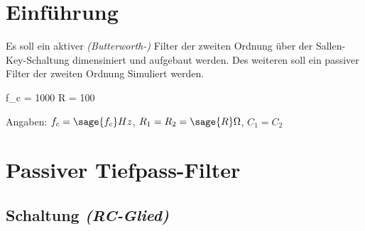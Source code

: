 \documentclass[a4paper]{hitec}
\author{Rene Hampölz, Gruppe 6}
\date{19. September 2022}
\begin{document}


\maketitletoc
\clearpage

\section{Einführung}

Es soll ein aktiver \textit{(Butterworth-)} Filter der zweiten Ordnung über der Sallen-Key-Schaltung dimensiniert und aufgebaut werden. Des weiteren soll ein passiver Filter der zweiten Ordnung Simuliert werden.

\begin{sagesilent}
    f_c = 1000
    R = 100
\end{sagesilent}

Angaben: $f_c = \sage{f_c}Hz$, $R_1 = R_2 = \sage{R}\Omega$, $C_1 = C_2$

\section{Passiver Tiefpass-Filter}

\subsection{Schaltung \textit{(RC-Glied)}}
\end{document}
